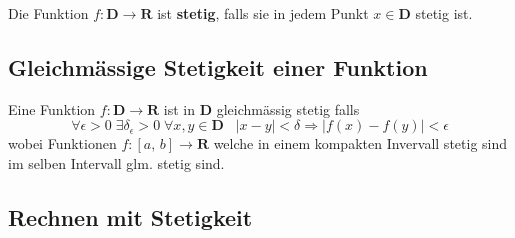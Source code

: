 \documentclass[8pt]{article}
\begin{document}
\begin{multicols*}{3}
Die Funktion $f: \mathbf{D} \rightarrow \mathbf{R}$ ist \textbf{stetig}, falls sie
in jedem Punkt $x \in \mathbf{D}$ stetig ist.

\subsection{Gleichmässige Stetigkeit einer Funktion}

Eine Funktion $f:\mathbf{D} \rightarrow \mathbf{R}$ ist in $\mathbf{D}$ gleichmässig
stetig falls $$ \forall \epsilon > 0 \; \exists \delta_{\epsilon} > 0 \;\forall x, y \in \mathbf{D}\;\;\; |x-y| < \delta \Rightarrow |f(x) - f(y)| < \epsilon $$
wobei Funktionen $f:[a,\,b] \rightarrow \mathbf{R}$ welche in einem kompakten Invervall stetig sind im selben Intervall glm. stetig sind.

\subsection{Rechnen mit Stetigkeit}


\end{multicols*}
\end{document}
